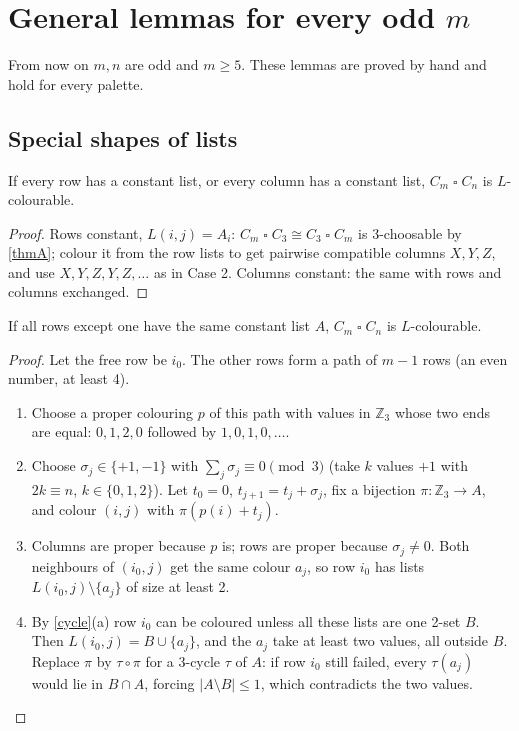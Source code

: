 \documentclass[11pt,oneside,openany]{book}
\newcounter{res}[chapter]
\renewcommand{\theres}{\thechapter.\arabic{res}}
\newenvironment{resultbox}[3]{\refstepcounter{res}\begin{tcolorbox}[breakable,colback=#1!5,colframe=#1,
  fonttitle=\bfseries,title={#2 \theres\ifx&#3&\else\ (#3)\fi}]}{\end{tcolorbox}}
\newenvironment{lemma}[1][]{\begin{resultbox}{prc}{Lemma}{#1}}{\end{resultbox}}
\newenvironment{corollary}[1][]{\begin{resultbox}{prc}{Corollary}{#1}}{\end{resultbox}}
\newenvironment{steps}[1][]{\begin{enumerate}[label=\textbf{Step \arabic*.},leftmargin=4.2em,itemsep=0.3em,#1]}{\end{enumerate}}
\newcommand{\T}{\mathbin{\square}}
\newcommand{\Z}{\mathbb{Z}}
\begin{document}
\chapter{General lemmas for every odd $m$}

From now on $m, n$ are odd and $m \ge 5$. These lemmas are proved by hand and hold for every palette.

\section{Special shapes of lists}

\begin{corollary}[constant rows or columns]\label{rowconst}
If every row has a constant list, or every column has a constant list, $C_m \T C_n$ is $L$-colourable.
\end{corollary}

\begin{proof}
Rows constant, $L(i, j) = A_i$: $C_m \T C_3 \cong C_3 \T C_m$ is 3-choosable by \ref{thmA}; colour it from the
row lists to get pairwise compatible columns $X, Y, Z$, and use $X, Y, Z, Y, Z, \dots$ as in Case 2.
Columns constant: the same with rows and columns exchanged.
\end{proof}

\begin{lemma}[one free row]\label{freerow}
If all rows except one have the same constant list $A$, $C_m \T C_n$ is $L$-colourable.
\end{lemma}

\begin{proof}
Let the free row be $i_0$. The other rows form a path of $m - 1$ rows (an even number, at least 4).
\begin{steps}
\item Choose a proper colouring $p$ of this path with values in $\Z_3$ whose two ends are equal:
$0,1,2,0$ followed by $1,0,1,0,\dots$.
\item Choose $\sigma_j \in \{+1, -1\}$ with $\sum_j \sigma_j \equiv 0 \pmod 3$ (take $k$ values $+1$ with
$2k \equiv n$, $k \in \{0,1,2\}$). Let $t_0 = 0$, $t_{j+1} = t_j + \sigma_j$, fix a bijection $\pi : \Z_3 \to A$,
and colour $(i, j)$ with $\pi(p(i) + t_j)$.
\item Columns are proper because $p$ is; rows are proper because $\sigma_j \ne 0$. Both neighbours of $(i_0, j)$
get the same colour $a_j$, so row $i_0$ has lists $L(i_0, j) \setminus \{a_j\}$ of size at least 2.
\item By \ref{cycle}(a) row $i_0$ can be coloured unless all these lists are one 2-set $B$. Then
$L(i_0, j) = B \cup \{a_j\}$, and the $a_j$ take at least two values, all outside $B$. Replace $\pi$ by
$\tau \circ \pi$ for a 3-cycle $\tau$ of $A$: if row $i_0$ still failed, every $\tau(a_j)$ would lie in $B \cap A$,
forcing $|A \setminus B| \le 1$, which contradicts the two values. \qedhere
\end{steps}
\end{proof}
\end{document}
